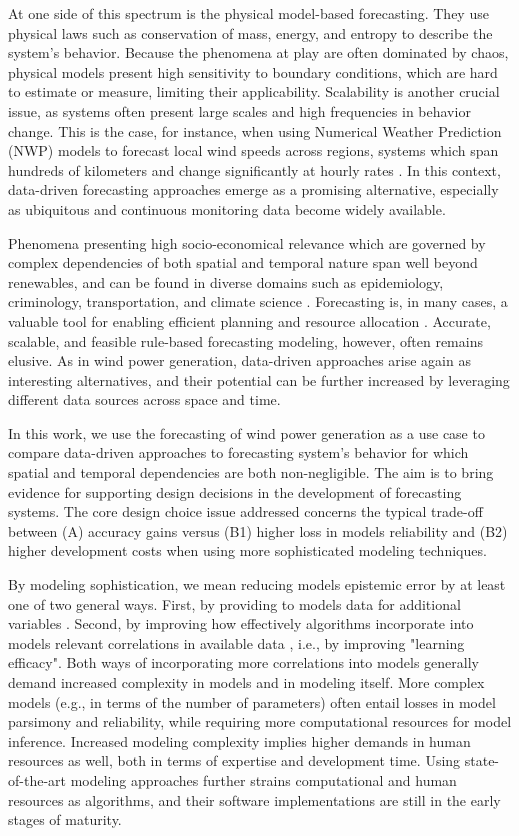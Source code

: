 At one side of this spectrum is the physical model-based forecasting.
They use physical laws such as conservation of mass, energy, and entropy to describe the system's behavior.
Because the phenomena at play are often dominated by chaos, physical models present high sensitivity to boundary conditions, which are hard to estimate or measure, limiting their applicability.
Scalability is another crucial issue, as systems often present large scales and high frequencies in behavior change.
This is the case, for instance, when using Numerical Weather Prediction (NWP) models to forecast local wind speeds across regions, systems which span hundreds of kilometers and change significantly at hourly rates \cite{holttinen2005hourly}.
In this context, data-driven forecasting approaches emerge as a promising alternative, especially as ubiquitous and continuous monitoring data become widely available.

Phenomena presenting high socio-economical relevance which are governed by complex dependencies of both spatial and temporal nature span well beyond renewables, and can be found in diverse domains such as epidemiology, criminology, transportation, and climate science \cite{atluri2018datamining}.
Forecasting is, in many cases, a valuable tool for enabling efficient planning and resource allocation \cite{armstrong2002principles}.
Accurate, scalable, and feasible rule-based forecasting modeling, however, often remains elusive.
As in wind power generation, data-driven approaches arise again as interesting alternatives, and their potential can be further increased by leveraging different data sources across space and time.

In this work, we use the forecasting of wind power generation as a use case to compare data-driven approaches to forecasting system's behavior for which spatial and temporal dependencies are both non-negligible.
The aim is to bring evidence for supporting design decisions in the development of forecasting systems.
The core design choice issue addressed concerns the typical trade-off between (A) accuracy gains versus (B1) higher loss in models reliability and (B2) higher development costs when using more sophisticated modeling techniques.

By modeling sophistication, we mean reducing models epistemic error by at least one of two general ways.
First, by providing to models data for additional variables \cite{hullermeier2020aleatoric}.
Second, by improving how effectively algorithms incorporate into models relevant correlations in available data \cite{hullermeier2020aleatoric}, i.e., by improving "learning efficacy".
Both ways of incorporating more correlations into models generally demand increased complexity in models and in modeling itself.
More complex models (e.g., in terms of the number of parameters) often entail losses in model parsimony and reliability, while requiring more computational resources for model inference.
Increased modeling complexity implies higher demands in human resources as well, both in terms of expertise and development time.
Using state-of-the-art modeling approaches further strains computational and human resources as algorithms, and their software implementations are still in the early stages of maturity.


